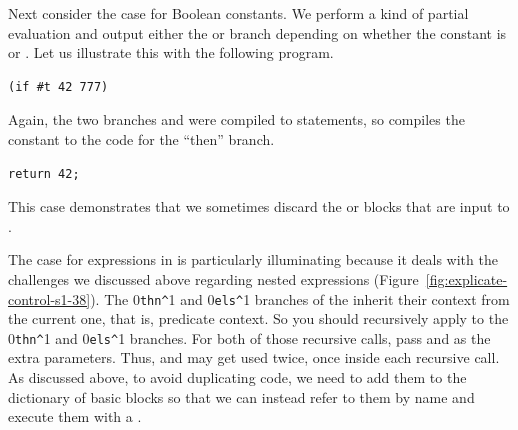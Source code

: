 \documentclass[7x10]{TimesAPriori_MIT}%
\def\racketEd{0}
\def\pythonEd{1}
\def\edition{1}
\newcommand{\racket}[1]{{\if\edition\racketEd{#1}\fi}}
\newcommand{\python}[1]{{\if\edition\pythonEd #1\fi}}
\begin{document}
Next consider the case for Boolean constants. We perform a kind of
partial evaluation and output
either the  or  branch depending on whether the
constant is \TRUE{} or \FALSE{}. Let us illustrate this with the
following program.
\begin{center}
\begin{minipage}{\textwidth}
\begin{lstlisting}
(if #t 42 777)
\end{lstlisting}
\end{minipage}
\end{center}
%
Again, the two branches  and  were compiled to
 statements, so  compiles the
constant  to the code for the ``then'' branch.
\begin{center}
\begin{minipage}{\textwidth}
\begin{lstlisting}
return 42;
\end{lstlisting}
\end{minipage}
\end{center}
%
This case demonstrates that we sometimes discard the  or
 blocks that are input to .

The case for  expressions in  is
particularly illuminating because it deals with the challenges we
discussed above regarding nested  expressions
(Figure~\ref{fig:explicate-control-s1-38}).  The
\racket{\lstinline{thn^}}\python{} and
\racket{\lstinline{els^}}\python{} branches of the
 inherit their context from the current one, that is,
predicate context. So you should recursively apply
 to the
\racket{\lstinline{thn^}}\python{} and
\racket{\lstinline{els^}}\python{} branches. For both of
those recursive calls, pass  and  as the extra
parameters. Thus,  and  may get used twice, once
inside each recursive call. As discussed above, to avoid duplicating
code, we need to add them to the dictionary of basic blocks so that we
can instead refer to them by name and execute them with a .
\end{document}
